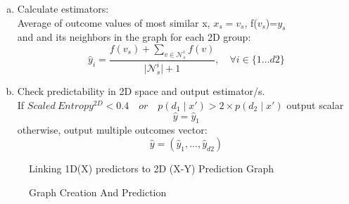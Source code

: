 \documentclass[a4paper]{article}
\begin{document}
\begin{enumerate}[(a)]
  \item
    Calculate estimators:   \\
    Average of outcome values of most similar x, $x_s=v_s$,  f($v_s$)=$y_s$\\and 
    and  its neighbors  in the graph for each 2D group:
    \begin{equation}     
  \hat y_i = \dfrac{f(v_s) + \sum\limits_{v \in \mathcal{N}_s^{i}} f(v)}{\vert \mathcal{N}_s^{i} \vert +1},\quad \forall i \in \{1\dots d2 \}
\label{eqn:simple_one} 
\end{equation}
\item Check predictability in 2D space and output estimator/s.\\
If $Scaled \ Entropy^{2D} < 0.4 \quad or\quad p(d_1\mid x') > 2\times p(d_2\mid x')$
output scalar\\
\begin{equation}
  \hat y = \hat{y}_1
\end{equation}
otherwise, output multiple outcomes vector:\\
\begin{equation}
  \hat y = (\hat{y}_1,\dots,\hat{y}_{d2})
\end{equation}
\end{enumerate}

\begin{figure}[ht]
\centering
{}
\caption[Optional caption for list of figures]{Linking 1D(X) predictors to 2D (X-Y) Prediction Graph
 }
\label{fig:subfigureExample}
\end{figure}

 \begin{figure}[ht]
\centering
{}
\caption[Optional caption for list of figures]{Graph Creation And Prediction
 }
\label{fig:subfigureExample}
\end{figure}
\end{document}
